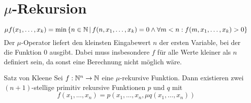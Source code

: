 \section{$\mu$-Rekursion}
\begin{equation*}
	\mu f(x_1,\ldots,x_k)=\min \left\{ n\in\mathbb{N} \,\middle|\, f(n,x_1,\ldots,x_k)=0 \wedge \forall m<n:f(m,x_1,\ldots,x_k)>0 \right\}
\end{equation*}
Der $\mu$-Operator liefert den kleinsten Eingabewert $n$ der ersten Variable, bei der die Funktion $0$ ausgibt. Dabei muss insbesondere $f$ für alle Werte kleiner als $n$ definiert sein, da sonst eine Berechnung nicht möglich wäre.

\begin{satz}{Satz von Kleene}
	Sei $f:\mathbb{N}^n\rightarrow\mathbb{N}$ eine $\mu$-rekursive Funktion. Dann existieren zwei $(n+1)$-stellige primitiv rekursive Funktionen $p$ und $q$ mit
	\begin{equation*}
		f(x_1,\ldots,x_n)=p(x_1,\ldots,x_n,\mu q(x_1,\ldots,x_n))
	\end{equation*}
\end{satz}
